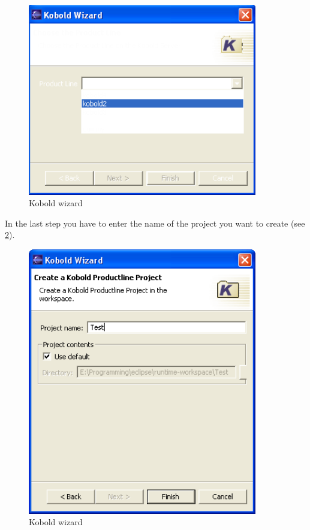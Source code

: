 \begin{figure}[h!]
\begin{center}
\includegraphics[width=10cm]{wizard2.png}
   \caption{Kobold wizard}
\label{wizard2}
\end{center}
\end{figure}\par

In the last step you have to enter the name of the project you want to create (see \ref{wizard3}).

\begin{figure}[h!]
\begin{center}
\includegraphics[width=10cm]{wizard3.png}
   \caption{Kobold wizard}
\label{wizard3}
\end{center}
\end{figure}\par


